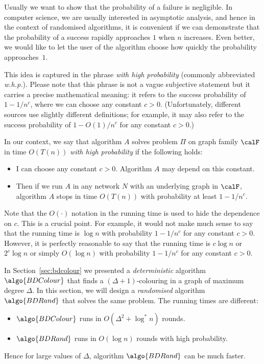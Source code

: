 Usually we want to show that the probability of a failure is negligible. In computer science, we are usually interested in asymptotic analysis, and hence in the context of randomised algorithms, it is convenient if we can demonstrate that the probability of a success rapidly approaches $1$ when $n$ increases. Even better, we would like to let the user of the algorithm choose how quickly the  probability approaches~$1$.

This idea is captured in the phrase \emph{with high probability} (commonly abbreviated \emph{w.h.p.}). Please note that this phrase is not a vague subjective statement but it carries a precise mathematical meaning: it refers to the success probability of $1 - 1/n^c$, where we can choose any constant $c > 0$. (Unfortunately, different sources use slightly different definitions; for example, it may also refer to the success probability of $1 - O(1)/n^c$ for any constant $c > 0$.)

In our context, we say that algorithm $A$ solves problem $\Pi$ on graph family $\calF$ in time $O(T(n))$ \emph{with high probability} if the following holds:
\begin{itemize}
    \item I can choose any constant $c > 0$. Algorithm $A$ may depend on this constant.
    \item Then if we run $A$ in any network $N$ with an underlying graph in $\calF$, algorithm $A$ stops in time $O(T(n))$ with probability at least $1 - 1/n^c$.
\end{itemize}
Note that the $O(\cdot)$ notation in the running time is used to hide the dependence on $c$. This is a crucial point. For example, it would not make much sense to say that the running time is $\log n$ with probability $1 - 1/n^c$ for any constant $c > 0$. However, it is perfectly reasonable to say that the running time is $c \log n$ or $2^c \log n$ or simply $O(\log n)$ with probability $1 - 1/n^c$ for any constant $c > 0$.


\label{sec:bdrand}

In Section~\ref{sec:bdcolour} we presented a \emph{deterministic} algorithm $\algo{BDColour}$ that finds a ${(\Delta+1)}$-colouring in a graph of maximum degree $\Delta$. In this section, we will design a \emph{randomised} algorithm $\algo{BDRand}$ that solves the same problem. The running times are different:
\begin{itemize}[noitemsep]
    \item $\algo{BDColour}$ runs in $O(\Delta^2 + \log^* n)$ rounds.
    \item $\algo{BDRand}$ runs in $O(\log n)$ rounds with high probability.
\end{itemize}
Hence for large values of $\Delta$, algorithm $\algo{BDRand}$ can be much faster.


